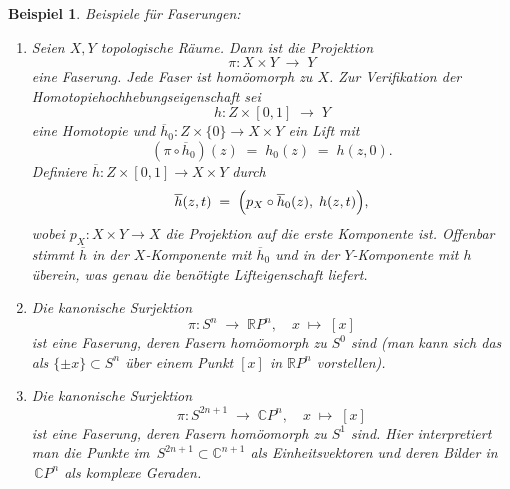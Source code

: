 \documentclass[12pt]{article}
\numberwithin{conj}{section}
\newtheorem{example}[conj]{Beispiel}
\begin{document}
    \begin{example}
        \label{examplesFibrations} Beispiele für Faserungen:
        \begin{enumerate}[nolistsep]
            \item Seien $X,Y$ topologische Räume. Dann ist die Projektion
                \[
                    \pi : X \times Y \;\longrightarrow\; Y
                \]
                eine Faserung. Jede Faser ist homöomorph zu $X$. Zur Verifikation der
                Homotopiehochhebungseigenschaft sei
                \[
                    h : Z \times [0,1] \;\longrightarrow\; Y
                \]
                eine Homotopie und $\overline{h}_{0} : Z \times \{0\} \to X \times Y$
                ein Lift mit
                \[
                    (\pi \circ \overline{h}_{0})(z) \;=\; h_{0}(z) \;=\; h(z,0).
                \]
                Definiere $\overline{h}: Z \times [0,1] \to X \times Y$ durch
                \[
                    \overline{h}(z,t) \;=\; \Bigl( p_{X} \circ \overline{h}_{0} (
                    z),\; h(z,t)\Bigr),
                \]
                wobei $p_{X} : X \times Y \to X$ die Projektion auf die erste Komponente
                ist. Offenbar stimmt $\overline{h}$ in der $X$-Komponente mit $\overline{h}
                _{0}$ und in der $Y$-Komponente mit $h$ überein, was genau die benötigte
                Lifteigenschaft liefert.

            \item Die kanonische Surjektion
                \[
                    \pi : S^{n} \;\longrightarrow\; \mathbb{R}P^{n},\quad x \;\mapsto\; [x]
                \]
                ist eine Faserung, deren Fasern homöomorph zu $S^{0}$ sind (man kann sich
                das als $\{\pm x\}\subset S^{n}$ über einem Punkt $[x]$ in $\mathbb{R}P^{n}$
                vorstellen).

            \item Die kanonische Surjektion
                \[
                    \pi : S^{2n+1}\;\longrightarrow\; \mathbb{C}P^{n},\quad x \;\mapsto\; [
                    x]
                \]
                ist eine Faserung, deren Fasern homöomorph zu $S^{1}$ sind. Hier interpretiert
                man die Punkte im $\,S^{2n+1}\subset \mathbb{C}^{n+1}$ als Einheitsvektoren
                und deren Bilder in $\,\mathbb{C}P^{n}$ als komplexe Geraden.
        \end{enumerate}
    \end{example}
\end{document}
